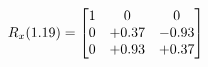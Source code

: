\documentclass[preview]{standalone}
\begin{document}
\begin{align*}
\special{dvisvgm:raw <g id='unique000'>}R_{x}(1.19) = \begin{bmatrix}1 & 0 & 0 \\0 & +0.37 & -0.93 \\0 & +0.93 & +0.37\end{bmatrix}\special{dvisvgm:raw </g>}
\end{align*}
\end{document}
